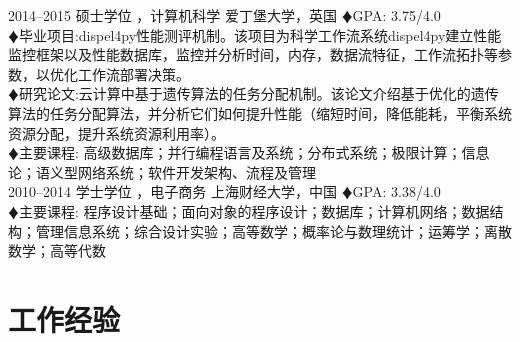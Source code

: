\documentclass[]{friggeri-cv-cn} %
\begin{document}
\begin{entrylist}
\entry
{2014--2015}
{硕士学位 {\normalfont ，计算机科学}}
{爱丁堡大学，英国}
{
{\color{red} $\vardiamondsuit $}GPA: 3.75/4.0\\
{\color{red} $\vardiamondsuit $}毕业项目:dispel4py性能测评机制。该项目为科学工作流系统dispel4py建立性能监控框架以及性能数据库，监控并分析时间，内存，数据流特征，工作流拓扑等参数，以优化工作流部署决策。\\
{\color{red} $\vardiamondsuit $}研究论文:云计算中基于遗传算法的任务分配机制。该论文介绍基于优化的遗传算法的任务分配算法，并分析它们如何提升性能（缩短时间，降低能耗，平衡系统资源分配，提升系统资源利用率）。\\
{\color{red} $\vardiamondsuit $}主要课程:
高级数据库；并行编程语言及系统；分布式系统；极限计算；信息论；语义型网络系统；软件开发架构、流程及管理
}
\\
\entry
{2010--2014}
{学士学位 {\normalfont ，电子商务}}
{上海财经大学，中国}
{
{\color{red} $\vardiamondsuit $}GPA: 3.38/4.0\\
{\color{red} $\vardiamondsuit $}主要课程:
程序设计基础；面向对象的程序设计；数据库；计算机网络；数据结构；管理信息系统；综合设计实验；高等数学；概率论与数理统计；运筹学；离散数学；高等代数
}
\end{entrylist}


\section{工作经验}
\end{document}
